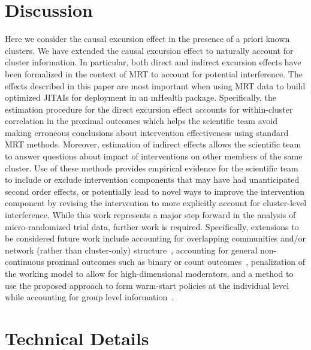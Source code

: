 \documentclass[12pt]{article}
\begin{document}
\section{Discussion}

Here we consider the causal excursion effect in the presence of a priori known clusters.  We have extended the causal excursion effect to naturally account for cluster information. In particular, both direct and indirect excursion effects have been formalized in the context of MRT to account for potential interference.  The effects described in this paper are most important when using MRT data to build optimized JITAIs for deployment in an mHealth package. Specifically, the estimation procedure for the direct excursion effect accounts for within-cluster correlation in the proximal outcomes which helps the scientific team avoid making erroneous conclusions about intervention effectiveness using standard MRT methods.  Moreover, estimation of indirect effects allows the scientific team to answer questions about impact of interventions on other members of the same cluster.  Use of these methods provides empirical evidence for the scientific team to include or exclude intervention components that may have had unanticipated second order effects, or potentially lead to novel ways to improve the intervention component by revising the intervention to more explicitly account for cluster-level interference.  While this work represents a major step forward in the analysis of micro-randomized trial data, further work is required.  Specifically, extensions to be considered future work include accounting for overlapping communities and/or network (rather than cluster-only) structure~\citep{Ogburn2014,Mealli2019}, accounting for general non-continuous proximal outcomes such as binary or count outcomes~\citep{Qian2021}, penalization of the working model to allow for high-dimensional moderators, and a method to use the proposed approach to form warm-start policies at the individual level while accounting for group level information~\citep{Luckett2020}.




\newpage

\appendix

\section{Technical Details}
\label{app:techdetails}
\end{document}
